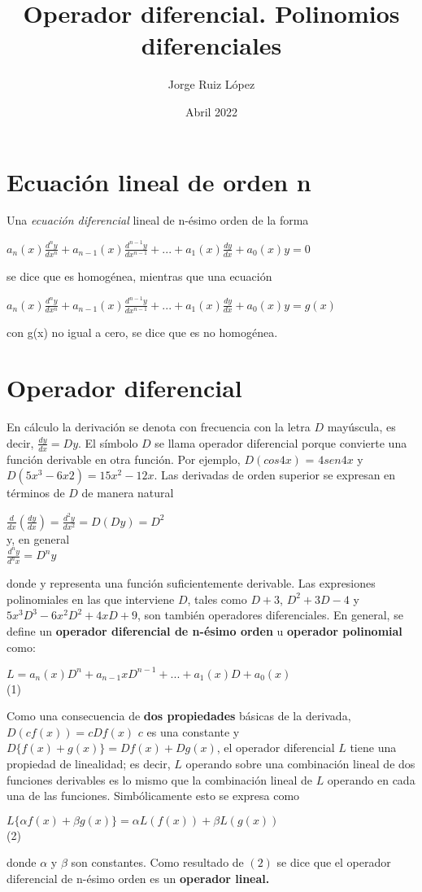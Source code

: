 \documentclass{article}
\title{Operador diferencial. Polinomios diferenciales}
\author{Jorge Ruiz López}
\affil{Facultad de Ingeniería UNAM}
\date{Abril 2022}
\begin{document}
\maketitle
\section{Ecuación lineal de orden n}
Una \cite{zill}\textit{ecuación diferencial} lineal de n-ésimo orden de la forma
\begin{center}
    $a_n(x)\frac{d^ny}{dx^n} + a_{n-1}(x)\frac{d^{n-1}y}{dx^{n-1}}+...+a_1(x)\frac{dy}{dx}+a_0(x)y = 0$
\end{center}
se dice que es homogénea, mientras que una ecuación
\begin{center}
     $a_n(x)\frac{d^ny}{dx^n} + a_{n-1}(x)\frac{d^{n-1}y}{dx^{n-1}}+...+a_1(x)\frac{dy}{dx}+a_0(x)y = g(x)$
\end{center}
con g(x) no igual a cero, se dice que es no homogénea.
\section{Operador diferencial}En cálculo la derivación se denota con frecuencia con la letra $D$ mayúscula, es decir, $\frac{dy}{dx} =Dy$. El símbolo $D$ se llama operador diferencial porque convierte una función derivable en otra función. Por ejemplo, 
$D(cos 4x)$ = $4 sen 4x$ y $D(5x^3 - 6x2
) = 15x^2 - 12x$. Las derivadas de orden superior se expresan en términos de $D$ de manera natural
\begin{center}
    $\frac{d}{dx}(\frac{dy}{dx}) = \frac{d^2y}{dx^2} = D(Dy) = D^2$\\
    y, en general\\
    $\frac{d^ny}{d^nx} = D^n y$
\end{center}
donde y representa una función suficientemente derivable. Las expresiones polinomiales en las que interviene $D$, tales como $D + 3$, $D^2+ 3D - 4$ y $5x^3 D^3 - 6x^2 D^2 + 4xD +9 $, son también operadores diferenciales. En general, se define un \textbf{operador diferencial de n-ésimo orden} u \textbf{operador polinomial}  como:
\begin{center}
    $L = a_n(x)D^n + a_{n-1}xD^{n-1}+...+a_1(x)D + a_0(x)$\\(1)\break
\end{center}
Como una consecuencia de \textbf{dos propiedades} básicas de la derivada, $D(cf(x)) = cDf(x)$ $c$ es una constante y $D\{ f(x)+g(x)\} = Df(x) + Dg(x)$, el operador diferencial $L$ tiene una propiedad de linealidad; es decir, $L$ operando sobre una combinación lineal de dos 
funciones derivables es lo mismo que la combinación lineal de $L$ operando en cada una de las funciones. Simbólicamente esto se expresa como
\begin{center}
    $L \{ \alpha f(x) + \beta g(x)\} = \alpha L(f(x)) + \beta L(g(x))$\\(2)\break
\end{center}
donde $\alpha$ y $\beta$  son constantes. Como resultado de $(2)$ se dice que el operador diferencial de n-ésimo orden es un    \textbf{operador lineal.}
\end{document}
